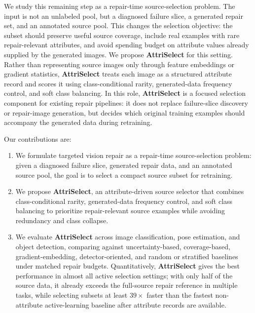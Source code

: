 \documentclass{article}
\newcommand{\modelname}{AttriSelect}
\newcommand{\model}{\textcolor{darkteal}{\textbf{\modelname}}\xspace}
\begin{document}
We study this remaining step as a repair-time source-selection problem. The input is not an unlabeled pool, but a diagnosed failure slice, a generated repair set, and an annotated source pool. This changes the selection objective: the subset should preserve useful source coverage, include real examples with rare repair-relevant attributes, and avoid spending budget on attribute values already supplied by the generated images. We propose \model for this setting. Rather than representing source images only through feature embeddings or gradient statistics, \model treats each image as a structured attribute record and scores it using class-conditional rarity, generated-data frequency control, and soft class balancing. In this role, \model is a focused selection component for existing repair pipelines: it does not replace failure-slice discovery or repair-image generation, but decides which original training examples should accompany the generated data during retraining.

Our contributions are:
\begin{enumerate}
\item We formulate targeted vision repair as a repair-time source-selection problem: given a diagnosed failure slice, generated repair data, and an annotated source pool, the goal is to select a compact source subset for retraining.

\item We propose \model, an attribute-driven source selector that combines class-conditional rarity, generated-data frequency control, and soft class balancing to prioritize repair-relevant source examples while avoiding redundancy and class collapse.


\item We evaluate \model across image classification, pose estimation, and object detection, comparing against uncertainty-based, coverage-based, gradient-embedding, detector-oriented, and random or stratified baselines under matched repair budgets. Quantitatively, \model gives the best performance in almost all active selection settings; with only half of the source data, it already exceeds the full-source repair reference in multiple tasks, while selecting subsets at least $39\times$ faster than the fastest non-attribute active-learning baseline after attribute records are available.

\end{enumerate}
\end{document}
